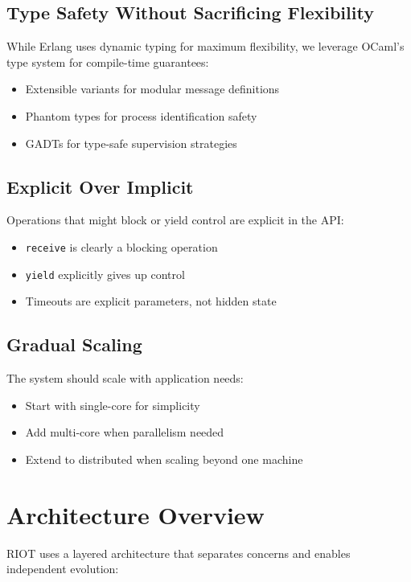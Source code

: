 \documentclass[12pt,a4paper]{report}
\begin{document}
\subsection{Type Safety Without Sacrificing Flexibility}
While Erlang uses dynamic typing for maximum flexibility, we leverage OCaml's type system for compile-time guarantees:
\begin{itemize}
\item Extensible variants for modular message definitions
\item Phantom types for process identification safety
\item GADTs for type-safe supervision strategies
\end{itemize}

\subsection{Explicit Over Implicit}
Operations that might block or yield control are explicit in the API:
\begin{itemize}
\item \texttt{receive} is clearly a blocking operation
\item \texttt{yield} explicitly gives up control
\item Timeouts are explicit parameters, not hidden state
\end{itemize}

\subsection{Gradual Scaling}
The system should scale with application needs:
\begin{itemize}
\item Start with single-core for simplicity
\item Add multi-core when parallelism needed
\item Extend to distributed when scaling beyond one machine
\end{itemize}

\section{Architecture Overview}

RIOT uses a layered architecture that separates concerns and enables independent evolution:
\end{document}
